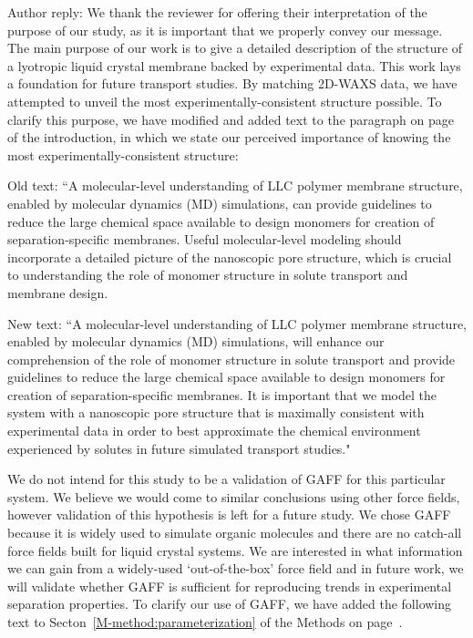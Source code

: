 \documentclass{article}
\begin{document}
\begin{enumerate}
\begin{quote}
    \end{quote}

    Author reply: We thank the reviewer for offering their interpretation of
    the purpose of our study, as it is important that we properly convey our
    message. The main purpose of our work is to give a detailed description of the
    structure of a lyotropic liquid crystal membrane backed by experimental data.
    This work lays a foundation for future transport studies. By matching 2D-WAXS
    data, we have attempted to unveil the most experimentally-consistent structure
    possible. To clarify this purpose, we have modified and added text to the
    paragraph on page~\pageref{M-rework:purpose} of the introduction, in which we
    state our perceived importance of knowing the most experimentally-consistent
    structure:

    Old text: ``A molecular-level understanding of LLC polymer membrane
    structure, enabled by molecular dynamics (MD) simulations, can provide
    guidelines to reduce the large chemical space available to design monomers for
    creation of separation-specific membranes. Useful molecular-level modeling
    should incorporate a detailed picture of the nanoscopic pore structure, which
    is crucial to understanding the role of monomer structure in solute transport
    and membrane design. 

    New text: ``A molecular-level understanding of LLC polymer membrane
    structure, enabled by molecular dynamics (MD) simulations, will enhance our
    comprehension of the role of monomer structure in solute transport and provide
    guidelines to reduce the large chemical space available to design monomers for
    creation of separation-specific membranes. It is important that we model the
    system with a nanoscopic pore structure that is maximally consistent with
    experimental data in order to best approximate the chemical environment experienced
    by solutes in future simulated transport studies."


    We do not intend for this study to be a validation of GAFF for this
    particular system. We believe we would come to similar conclusions using other
    force fields, however validation of this hypothesis is left for a future study.
    We chose GAFF because it is widely used to simulate organic molecules and there
    are no catch-all force fields built for liquid crystal systems. We are interested in
    what information we can gain from a widely-used `out-of-the-box' force field and in future
    work, we will validate whether GAFF is sufficient for reproducing trends in
    experimental separation properties. To clarify our use of GAFF, we have added
    the following text to Secton~\ref{M-method:parameterization} of the Methods on
    page~\pageref{M-method:parameterization}.


\end{enumerate}
\end{document}
